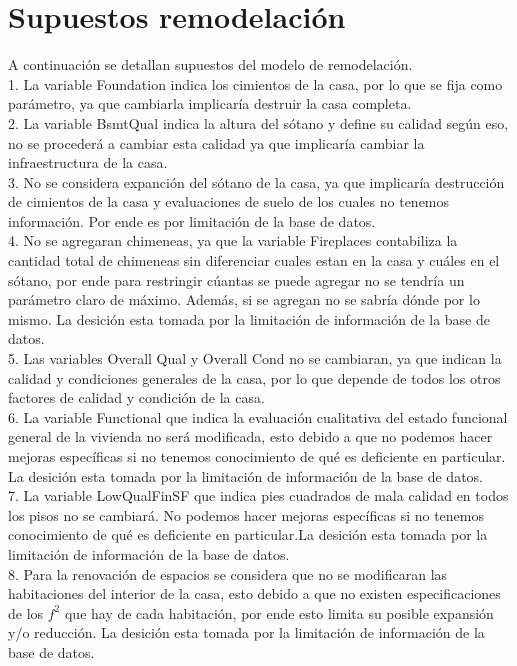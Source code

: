 
\section{Supuestos remodelación}
\label{sec:supuestos remodelación}
A continuación se detallan supuestos del modelo de remodelación.\\
1. La variable Foundation indica los cimientos de la casa, por lo que se fija como parámetro, ya que cambiarla implicaría destruir la casa completa.\\ 
2. La variable BsmtQual indica la altura del sótano y define su calidad según eso, no se procederá a cambiar esta calidad ya que implicaría cambiar la infraestructura de la casa. \\ 
3. No se considera expanción del sótano de la casa, ya que implicaría destrucción de cimientos de la casa y evaluaciones de suelo de los cuales no tenemos información. Por ende es por limitación de la base de datos.\\ 
4. No se agregaran chimeneas, ya que la variable Fireplaces contabiliza la cantidad total de chimeneas sin diferenciar cuales estan en la casa y cuáles en el sótano, por ende para restringir cúantas se puede agregar no se tendría un parámetro claro de máximo. Además, si se agregan no se sabría dónde por lo mismo. La desición esta tomada por la limitación de información de la base de datos.\\ 
5. Las variables Overall Qual y Overall Cond no se cambiaran, ya que indican la calidad y condiciones generales de la casa, por lo que depende de todos los otros factores de calidad y condición de la casa.\\  
6. La variable Functional que indica la evaluación cualitativa del estado funcional general de la vivienda no será modificada, esto debido a que no podemos hacer mejoras específicas si no tenemos conocimiento de qué es deficiente en particular. La desición esta tomada por la limitación de información de la base de datos.\\ 
7. La variable LowQualFinSF que indica pies cuadrados de mala calidad en todos los pisos no se cambiará. No podemos hacer mejoras específicas si no tenemos conocimiento de qué es deficiente en particular.La desición esta tomada por la limitación de información de la base de datos.\\
8. Para la renovación de espacios se considera que no se modificaran las habitaciones del interior de la casa, esto debido a que no existen especificaciones de los $f^{2}$ que hay de cada habitación, por ende esto limita su posible expansión y/o reducción. La desición esta tomada por la limitación de información de la base de datos.\\

